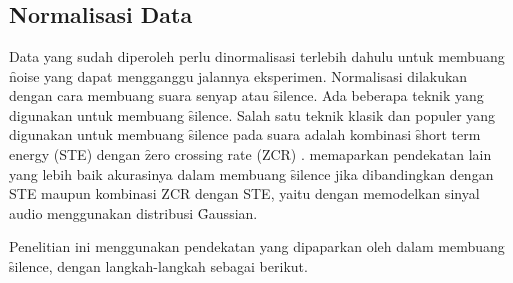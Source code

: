 \chapter{\babEmpat} \label{eksperimen}

\section{Normalisasi Data}
Data yang sudah diperoleh perlu dinormalisasi terlebih dahulu untuk membuang \f{noise} yang dapat mengganggu jalannya eksperimen. Normalisasi dilakukan dengan cara membuang suara senyap atau \f{silence}. Ada beberapa teknik yang digunakan untuk membuang \f{silence}. Salah satu teknik klasik dan populer yang digunakan untuk membuang \f{silence} pada suara adalah kombinasi \f{short term energy} (STE) dengan \f{zero crossing rate} (ZCR) \citep{rabiner1978digital}. \cite{saha2005new} memaparkan pendekatan lain yang lebih baik akurasinya dalam membuang \f{silence} jika dibandingkan dengan STE maupun kombinasi ZCR dengan STE, yaitu dengan memodelkan sinyal audio menggunakan distribusi \f{Gaussian}.

Penelitian ini menggunakan pendekatan yang dipaparkan oleh \cite{saha2005new} dalam membuang \f{silence}, dengan langkah-langkah sebagai berikut.

